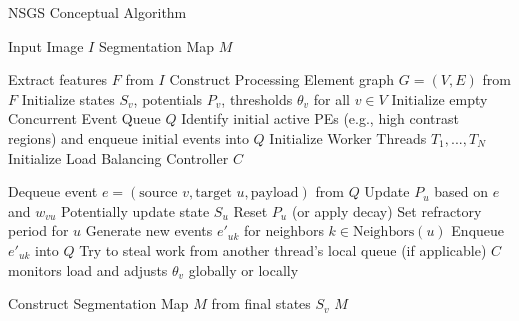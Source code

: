 \documentclass[conference]{IEEEtran}
\begin{document}
\begin{algorithm}
\caption{NSGS Conceptual Algorithm}
\label{alg:nsgs}
\begin{algorithmic}[1] %
\REQUIRE Input Image \(I\)
\ENSURE Segmentation Map \(M\)

\STATE Extract features \(F\) from \(I\)
\STATE Construct Processing Element graph \(G=(V, E)\) from \(F\)
\STATE Initialize states \(S_v\), potentials \(P_v\), thresholds \(\theta_v\) for all \(v \in V\)
\STATE Initialize empty Concurrent Event Queue \(Q\)
\STATE Identify initial active PEs (e.g., high contrast regions) and enqueue initial events into \(Q\)
\STATE Initialize Worker Threads \(T_1, ..., T_N\)
\STATE Initialize Load Balancing Controller \(C\)

            \STATE Dequeue event \(e = (\text{source } v, \text{target } u, \text{payload})\) from \(Q\)
            \STATE Update \(P_u\) based on \(e\) and \(w_{vu}\) 
                \STATE Potentially update state \(S_u\)
                \STATE Reset \(P_u\) (or apply decay)
                \STATE Set refractory period for \(u\)
                \STATE Generate new events \(e'_{uk}\) for neighbors \(k \in \text{Neighbors}(u)\)
                \STATE Enqueue \(e'_{uk}\) into \(Q\) 
            \ENDIF
        \ELSE %
            \STATE Try to steal work from another thread's local queue (if applicable)
        \ENDIF
    \ENDFOR
    \STATE \(C\) monitors load and adjusts \(\theta_v\) globally or locally 
\ENDWHILE

\STATE Construct Segmentation Map \(M\) from final states \(S_v\)
\RETURN \(M\)
\end{algorithmic}
\end{algorithm}
\end{document}

